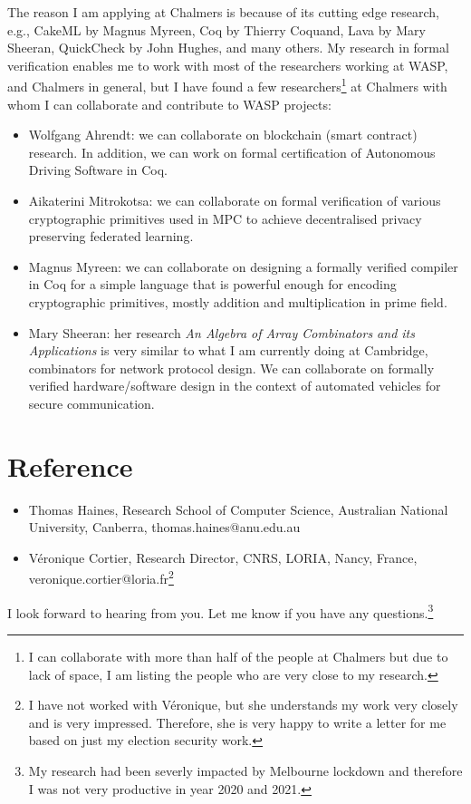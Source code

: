 \documentclass[11pt,a4paper,roman]{moderncv}
\begin{document}
The reason I am applying at Chalmers is because of its cutting edge research, 
e.g., CakeML by Magnus Myreen, Coq by Thierry Coquand, Lava by Mary Sheeran, 
QuickCheck by John Hughes, and many others. My research in formal verification 
enables me to work with most of the researchers working at WASP, and Chalmers in 
general, but I have found a few researchers\footnote{I can collaborate with 
more than half of the people at Chalmers but due to lack of space, I am listing the people who
are very close to my research.} at Chalmers with whom I can collaborate 
and contribute to WASP projects:
\begin{itemize}
  \item Wolfgang Ahrendt: we can collaborate on blockchain (smart contract) research.
    In addition, we can work on formal certification of Autonomous Driving Software in Coq. 
  \item Aikaterini Mitrokotsa: we can collaborate on formal verification of 
    various cryptographic primitives used in MPC to achieve decentralised
    privacy preserving federated learning.
  \item Magnus Myreen: we can collaborate on designing a formally verified 
    compiler in Coq for a simple language that is  powerful enough for encoding 
    cryptographic primitives, mostly addition and multiplication in prime field.
  \item Mary Sheeran: her research \textit{An Algebra of Array Combinators and its Applications}
   is very similar to what I am currently doing at Cambridge, combinators for 
   network protocol design. We can collaborate on formally verified hardware/software  
   design in the context of automated vehicles for secure communication.
    
\end{itemize}

\section{Reference}
\begin{itemize}
  \item Thomas Haines, Research School of Computer Science, Australian National University, Canberra, thomas.haines@anu.edu.au
  \item V{\'e}ronique Cortier, Research Director, CNRS, LORIA, Nancy, France, veronique.cortier@loria.fr\footnote{I have not worked with V{\'e}ronique, but she understands my work 
  very closely and is very impressed. Therefore, she is very happy to write a letter for me based on just my election security work.}
\end{itemize}


\vspace{0.5cm}
I look forward to hearing from you. Let me know if you have any 
questions.\footnote{My research had been severly impacted by Melbourne lockdown and therefore
I was not very productive in year 2020 and 2021.} \\
 

\vspace{0.5cm}


\makeletterclosing
\end{document}
